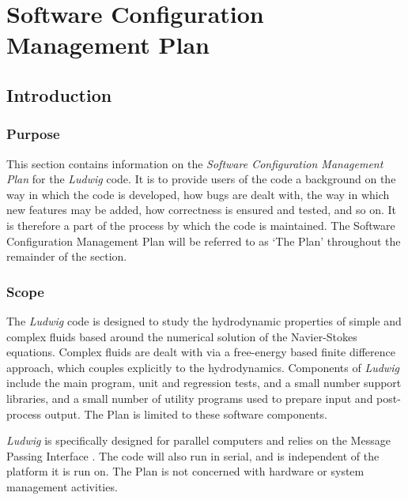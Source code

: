 %
%
%
%
%


\section{Software Configuration Management Plan}

\subsection{Introduction}

\subsubsection{Purpose}

This section contains information on the \textit{Software Configuration
Management Plan} for the \textit{Ludwig} code.
It is to provide users of the code a background on the way in which
the code is developed, how bugs are dealt with, the way in which
new features may be added, how correctness is ensured and tested, and so on.
It is therefore a part
of the process by which the code is maintained. The Software Configuration
Management Plan will be referred to as `The Plan' throughout the remainder
of the section.

\subsubsection{Scope}

The \textit{Ludwig} code is designed to study the hydrodynamic properties
of simple and complex fluids based around the numerical solution of the
Navier-Stokes equations. Complex fluids are dealt with via a free-energy
based finite difference approach, which couples explicitly to the
hydrodynamics.
Components of \textit{Ludwig} include the main program, unit and
regression tests, and a small number support libraries, and a small
number of utility programs used to prepare
input and post-process output. The Plan is limited to these
software components.

\textit{Ludwig} is specifically designed for parallel computers and
relies on the Message Passing Interface \cite{mpi-standard}. The
code will also run in serial, and is independent of
the platform it is run on. The Plan is not concerned with
hardware or system management activities.

